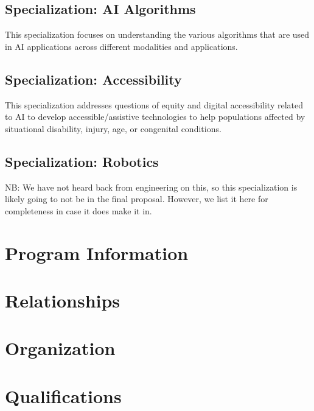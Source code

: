 \documentclass[
10pt, %
a4paper, %
oneside, %
headinclude,footinclude, %
BCOR5mm, %
]{scrartcl}
\begin{document}
\subsection{Specialization: AI Algorithms}

This specialization focuses on understanding the various algorithms that are used in AI applications across different modalities and applications.



\subsection{Specialization: Accessibility}

This specialization addresses questions of equity and digital accessibility related to AI to develop accessible/assistive technologies to help populations affected by situational disability, injury, age, or congenital conditions.



\subsection{Specialization: Robotics}

NB: We have not heard back from engineering on this, so this specialization is likely going to not be in the final proposal.  However, we list it here for completeness in case it does make it in. 




\section{Program Information}




\section{Relationships}




\section{Organization}


\section{Qualifications}
\end{document}
